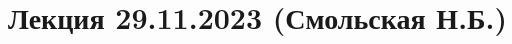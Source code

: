 \documentclass[main.tex]{subfiles}
\begin{document}
\section{Лекция 29.11.2023 (Смольская Н.Б.)}
\end{document}

